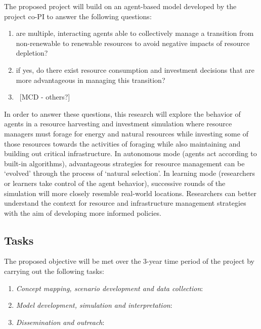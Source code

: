 \documentclass[11pt,a4paper]{article}
\begin{document}
The proposed project will build on an agent-based model
developed by the project co-PI to answer the following questions:
\begin{enumerate}
\vspace{-9pt}
\setlength{\itemsep}{-3pt}
	\item	are multiple, interacting agents able to collectively manage 
				a transition from non-renewable to renewable resources 
				to avoid negative impacts of resource depletion?
	\item	if yes, do there exist resource consumption and investment decisions
				that are more advantageous in managing this transition?
	\item	~[MCD - others?]
\end{enumerate}


%

In order to answer these questions,
this research will explore the behavior of agents in 
a resource harvesting and investment simulation where 
resource managers must forage for energy and natural resources 
while investing some of those resources towards the activities of foraging 
while also maintaining and building out critical infrastructure. 
In autonomous mode (agents act according to built-in algorithms), 
advantageous strategies for resource management can be 
`evolved' through the process of `natural selection'. 
In learning mode (researchers or learners take control of the agent behavior), 
successive rounds of the simulation will more closely resemble real-world locations. 
Researchers can better understand the context for 
resource and infrastructure management strategies 
with the aim of developing more informed policies.

\subsection{Tasks}
\label{sec:tasks}

The proposed objective will be met over the 3-year time period of the project by carrying out the following tasks:

\begin{enumerate}[leftmargin=0.75in,label= \emph{Task \arabic*}]
\vspace{-9pt}
\setlength{\itemsep}{-3pt}
	\item	\emph{Concept mapping,  scenario development and data collection}: 		\label{task:concept}
	\item	\emph{Model development, simulation and interpretation}: 		\label{task:development}
	\item	\emph{Dissemination and outreach}: 		\label{task:dissemination}
\end{enumerate}
\end{document}
